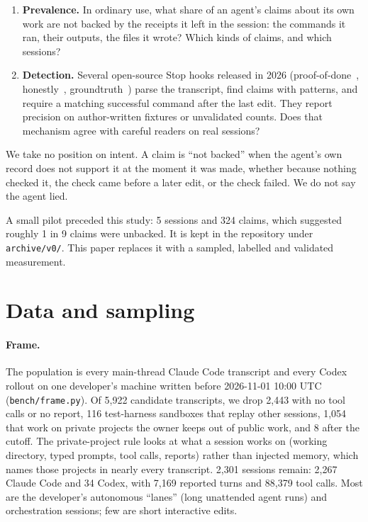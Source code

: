 \documentclass[11pt]{article}
\begin{document}
\begin{enumerate}
\item \textbf{Prevalence.} In ordinary use, what share of an agent's claims about its own work are not backed by
the receipts it left in the session: the commands it ran, their outputs, the files it wrote? Which kinds of
claims, and which sessions?
\item \textbf{Detection.} Several open-source Stop hooks released in 2026 (proof-of-done~\citep{boyko2026proofofdone},
honestly~\citep{honestly2026}, groundtruth~\citep{groundtruth2026}) parse the transcript, find claims with
patterns, and require a matching successful command after the last edit. They report precision on
author-written fixtures or unvalidated counts. Does that mechanism agree with careful readers on real sessions?
\end{enumerate}

We take no position on intent. A claim is ``not backed'' when the agent's own record does not support it at the
moment it was made, whether because nothing checked it, the check came before a later edit, or the check
failed. We do not say the agent lied.

A small pilot preceded this study: 5 sessions and 324 claims, which suggested roughly 1 in 9 claims were
unbacked. It is kept in the repository under \texttt{archive/v0/}. This paper replaces it with a sampled,
labelled and validated measurement.

\section{Data and sampling}

\paragraph{Frame.} The population is every main-thread Claude Code transcript and every Codex rollout on one
developer's machine written before 2026-11-01 10:00 UTC (\texttt{bench/frame.py}). Of 5,922 candidate
transcripts, we drop 2,443 with no tool calls or no report, 116 test-harness sandboxes that replay other
sessions, 1,054 that work on private projects the owner keeps out of public work, and 8 after the cutoff. The
private-project rule looks at what a session works on (working directory, typed prompts, tool calls, reports)
rather than injected memory, which names those projects in nearly every transcript. 2,301 sessions remain:
2,267 Claude Code and 34 Codex, with 7,169 reported turns and 88,379 tool calls. Most are the developer's
autonomous ``lanes'' (long unattended agent runs) and orchestration sessions; few are short interactive edits.
\end{document}
